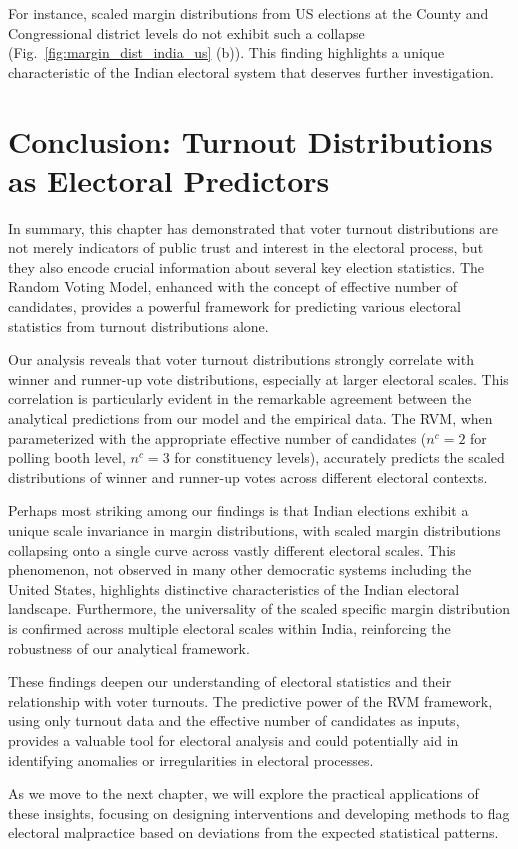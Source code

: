 For instance, scaled margin distributions from US elections at the County and Congressional district levels do not exhibit such a collapse (Fig.~\ref{fig:margin_dist_india_us} (b)). This finding highlights a unique characteristic of the Indian electoral system that deserves further investigation.

\section{Conclusion: Turnout Distributions as Electoral Predictors}

In summary, this chapter has demonstrated that voter turnout distributions are not merely indicators of public trust and interest in the electoral process, but they also encode crucial information about several key election statistics. The Random Voting Model, enhanced with the concept of effective number of candidates, provides a powerful framework for predicting various electoral statistics from turnout distributions alone.

Our analysis reveals that voter turnout distributions strongly correlate with winner and runner-up vote distributions, especially at larger electoral scales. This correlation is particularly evident in the remarkable agreement between the analytical predictions from our model and the empirical data. The RVM, when parameterized with the appropriate effective number of candidates ($n^c = 2$ for polling booth level, $n^c = 3$ for constituency levels), accurately predicts the scaled distributions of winner and runner-up votes across different electoral contexts.

Perhaps most striking among our findings is that Indian elections exhibit a unique scale invariance in margin distributions, with scaled margin distributions collapsing onto a single curve across vastly different electoral scales. This phenomenon, not observed in many other democratic systems including the United States, highlights distinctive characteristics of the Indian electoral landscape. Furthermore, the universality of the scaled specific margin distribution is confirmed across multiple electoral scales within India, reinforcing the robustness of our analytical framework.

These findings deepen our understanding of electoral statistics and their relationship with voter turnouts. The predictive power of the RVM framework, using only turnout data and the effective number of candidates as inputs, provides a valuable tool for electoral analysis and could potentially aid in identifying anomalies or irregularities in electoral processes.

As we move to the next chapter, we will explore the practical applications of these insights, focusing on designing interventions and developing methods to flag electoral malpractice based on deviations from the expected statistical patterns.
